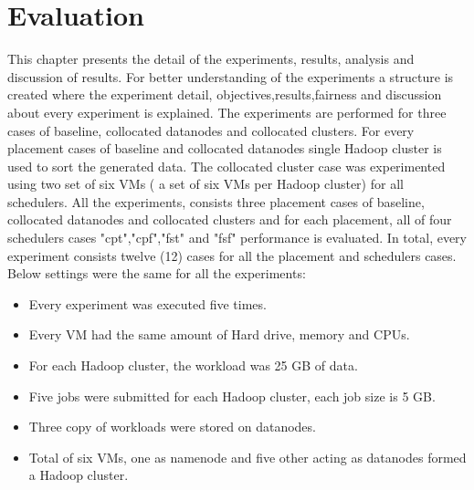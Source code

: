 
\chapter{Evaluation} %

\label{Chapter5} %


This chapter presents the detail of the experiments, results, analysis and discussion of results. For better understanding of the experiments a structure is created where the experiment detail, objectives,results,fairness and discussion about every experiment is explained.  The experiments are performed for three cases of baseline, collocated datanodes and collocated clusters. For every placement cases of baseline and collocated datanodes single Hadoop cluster is used to sort the generated data. The collocated cluster case was experimented using two set of six VMs ( a set of six VMs per Hadoop cluster) for all schedulers. All the experiments, consists three placement cases of baseline, collocated datanodes and collocated clusters and for each placement, all of four schedulers cases "cpt","cpf","fst" and "fsf" performance is evaluated. In total, every experiment consists twelve (12) cases for all the placement and schedulers cases. Below settings were the same for all the experiments:

\begin{itemize}
\item{ Every experiment was executed five times.}
\item{ Every VM had the same amount of Hard drive, memory and CPUs.}
\item{ For each Hadoop cluster, the workload was 25 GB of data.}
\item{ Five jobs were submitted for each Hadoop cluster, each job size is 5 GB.}
\item{ Three copy of workloads were stored on datanodes.}
\item{ Total of six VMs, one as namenode and five other acting as datanodes formed a Hadoop cluster.}

\end{itemize} 

